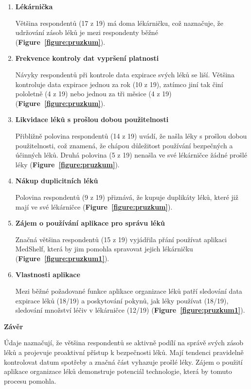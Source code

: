 \documentclass[a4paper, 11pt]{article}
\begin{document}
\begin{enumerate}
\item \textbf{Lékárnička}

Většina respondentů (17 z 19) má doma lékárničku, což naznačuje, že udržování zásob léků je mezi respondenty běžné (\textbf {Figure~\ref{figure:pruzkum}}).

\item \textbf {Frekvence kontroly dat vypršení platnosti}

Návyky respondentů při kontrole data expirace svých léků se liší. Většina kontroluje data expirace jednou za rok (10 z 19), zatímco jiní tak činí pololetně (4 z 19) nebo jednou za tři měsice (4 z 19) (\textbf {Figure~\ref{figure:pruzkum}}).

\item \textbf {Likvidace léků s prošlou dobou použitelnosti}

Přibližně polovina respondentů (14 z 19) uvádí, že našla léky s prošlou dobou použitelnosti, což znamená, že chápou důležitost používání bezpečných a účinných léků. Druhá polovina (5 z 19) nenašla ve své lékárničce žádné prošlé léky (\textbf {Figure~\ref{figure:pruzkum}}).

\item \textbf {Nákup duplicitních léků}

Polovina respondentů (9 z 19) přiznává, že kupuje duplikáty léků, které již mají ve své lékárničce (\textbf {Figure~\ref{figure:pruzkum}}).

\item \textbf {Zájem o používání aplikace pro správu léků}

Značná většina respondentů (15 z 19) vyjádřila přání používat aplikaci MedShelf, která by jim pomohla spravovat jejich lékárničku (\textbf {Figure~\ref{figure:pruzkum1}}).

\item \textbf {Vlastnosti aplikace}

Mezi běžné požadované funkce aplikace organizace léků patří sledování data expirace léků (18/19) a poskytování pokynů, jak léky používat (18/19), sledování množství léčiv v lékárničce (12/19) (\textbf {Figure~\ref{figure:pruzkum1}}).
\end{enumerate}

\textbf {Závěr}

Údaje naznačují, že většina respondentů se aktivně podílí na správě svých zásob léků a projevuje proaktivní přístup k bezpečnosti léků. Mají tendenci pravidelně kontrolovat datum spotřeby a značná část vyhazuje prošlé léky. Zájem o použití aplikace organizace léků demonstruje potenciál technologie, která by tomuto procesu pomohla.
\end{document}
